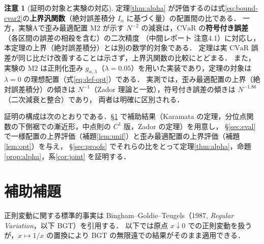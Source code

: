 \documentclass[a4paper,10pt]{jsarticle}
\theoremstyle{definition}
\newtheorem{remark}{注意}[section]
\newcommand{\CVaR}{\mathrm{CVaR}}
\begin{document}
\begin{remark}[証明の対象と実験の対応]
\label{rem:scope}
定理\ref{thm:alpha} が評価するのは式\eqref{eq:bound-cvar2}の\textbf{上界汎関数}（絶対誤差積分 $I_\alpha$ に基づく量）の配置間の比である．
一方，実験Aで歪み最適配置 M2 が示す $N^{-2}$ の減衰は，$\CVaR$ の\textbf{符号付き誤差}（各区間の誤差の相殺を含む）の二次精度
（中間レポート 注意4.1）に対応し，本定理の上界（絶対誤差積分）とは別の数学的対象である．
定理は実 $\CVaR$ 誤差が同じ比だけ改善することは示さず，上界汎関数の比較にとどまる．
また，実験の M2 は正則化歪み $g_{\alpha,\lambda}$（$\lambda=0.05$）を用いた実装であり，定理の対象は $\lambda=0$ の理想配置（式\eqref{eq:def-opt}）である．
実測では，歪み最適配置の上界（絶対誤差積分）の傾きは $N^{-1}$（Zador 理論と一致），符号付き誤差の傾きは $N^{-1.86}$（二次減衰と整合）であり，
両者は明確に区別される．
\end{remark}

証明の構成は次のとおりである．§\ref{sec:aux} で補助結果（Karamata の定理，分位点関数の下側裾での漸近形，中点則の $C^1$ 版，Zador の定理）を用意し，
§\ref{sec:eval} で一様配置の上界評価（補題\ref{lem:unif}）と歪み最適配置の上界評価（補題\ref{lem:opt}）を与え，
§\ref{sec:proofs} でそれらの比をとって定理\ref{thm:alpha}，命題\ref{prop:alpha}，系\ref{cor:joint} を証明する．

\section{補助補題}
\label{sec:aux}

正則変動に関する標準的事実は Bingham--Goldie--Teugels（1987, \textit{Regular Variation}，以下 BGT）を引用する．
以下では原点 $x\downarrow0$ での正則変動を扱うが，$x\mapsto1/x$ の置換により BGT の無限遠での結果がそのまま適用できる．
\end{document}
